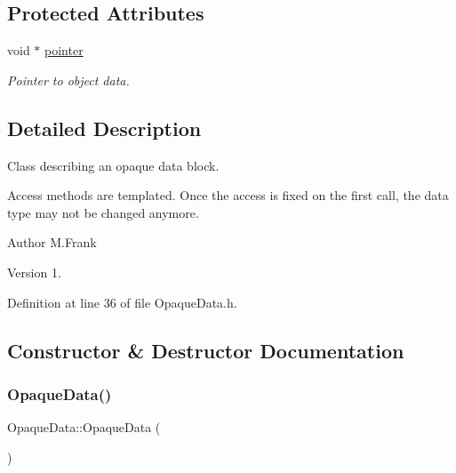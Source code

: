 \subsection*{Protected Attributes}
\begin{DoxyCompactItemize}
\item 
void $\ast$ \hyperlink{class_d_d4hep_1_1_opaque_data_af7f449f3359f7f7a7190e6c9467d01fe}{pointer}
\begin{DoxyCompactList}\small\item\em Pointer to object data. \end{DoxyCompactList}\end{DoxyCompactItemize}


\subsection{Detailed Description}
Class describing an opaque data block. 

Access methods are templated. Once the access is fixed on the first call, the data type may not be changed anymore.

\begin{DoxyAuthor}{Author}
M.\+Frank 
\end{DoxyAuthor}
\begin{DoxyVersion}{Version}
1. 
\end{DoxyVersion}


Definition at line 36 of file Opaque\+Data.\+h.



\subsection{Constructor \& Destructor Documentation}
\hypertarget{class_d_d4hep_1_1_opaque_data_a7651964645b371a757c78163ce663fd2}{}\label{class_d_d4hep_1_1_opaque_data_a7651964645b371a757c78163ce663fd2} 
\subsubsection{\texorpdfstring{Opaque\+Data()}{OpaqueData()}\hspace{0.1cm}{\footnotesize\ttfamily [1/2]}}
{\footnotesize\ttfamily Opaque\+Data\+::\+Opaque\+Data (\begin{DoxyParamCaption}{ }\end{DoxyParamCaption})\hspace{0.3cm}{\ttfamily [protected]}}



